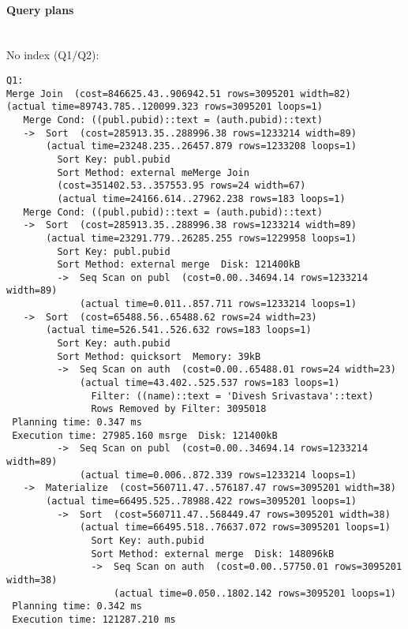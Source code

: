 \documentclass[11pt]{scrartcl}
\begin{document}
\paragraph{Query plans}\mbox{}\\ 

\noindent No index (Q1/Q2):
{\small
\begin{verbatim}
Q1:
Merge Join  (cost=846625.43..906942.51 rows=3095201 width=82)
(actual time=89743.785..120099.323 rows=3095201 loops=1)
   Merge Cond: ((publ.pubid)::text = (auth.pubid)::text)
   ->  Sort  (cost=285913.35..288996.38 rows=1233214 width=89)
       (actual time=23248.235..26457.879 rows=1233208 loops=1)
         Sort Key: publ.pubid
         Sort Method: external meMerge Join
         (cost=351402.53..357553.95 rows=24 width=67)
         (actual time=24166.614..27962.238 rows=183 loops=1)
   Merge Cond: ((publ.pubid)::text = (auth.pubid)::text)
   ->  Sort  (cost=285913.35..288996.38 rows=1233214 width=89)
       (actual time=23291.779..26285.255 rows=1229958 loops=1)
         Sort Key: publ.pubid
         Sort Method: external merge  Disk: 121400kB
         ->  Seq Scan on publ  (cost=0.00..34694.14 rows=1233214 width=89)
             (actual time=0.011..857.711 rows=1233214 loops=1)
   ->  Sort  (cost=65488.56..65488.62 rows=24 width=23)
       (actual time=526.541..526.632 rows=183 loops=1)
         Sort Key: auth.pubid
         Sort Method: quicksort  Memory: 39kB
         ->  Seq Scan on auth  (cost=0.00..65488.01 rows=24 width=23)
             (actual time=43.402..525.537 rows=183 loops=1)
               Filter: ((name)::text = 'Divesh Srivastava'::text)
               Rows Removed by Filter: 3095018
 Planning time: 0.347 ms
 Execution time: 27985.160 msrge  Disk: 121400kB
         ->  Seq Scan on publ  (cost=0.00..34694.14 rows=1233214 width=89)
             (actual time=0.006..872.339 rows=1233214 loops=1)
   ->  Materialize  (cost=560711.47..576187.47 rows=3095201 width=38)
       (actual time=66495.525..78988.422 rows=3095201 loops=1)
         ->  Sort  (cost=560711.47..568449.47 rows=3095201 width=38)
             (actual time=66495.518..76637.072 rows=3095201 loops=1)
               Sort Key: auth.pubid
               Sort Method: external merge  Disk: 148096kB
               ->  Seq Scan on auth  (cost=0.00..57750.01 rows=3095201 width=38)
                   (actual time=0.050..1802.142 rows=3095201 loops=1)
 Planning time: 0.342 ms
 Execution time: 121287.210 ms


\end{verbatim}}
\end{document}
